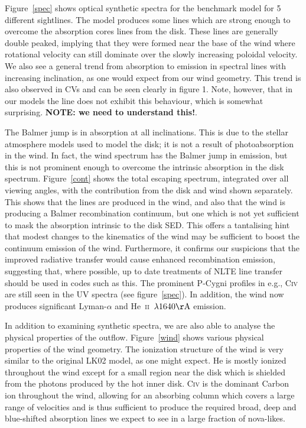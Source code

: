 \documentclass[preprint, a4paper, 11pt]{aastex}
\begin{document}
Figure~\ref{spec} shows optical synthetic spectra for the benchmark 
model for 5 different sightlines.  
The model produces some lines which are strong enough to overcome
the absorption cores lines from the disk. These lines are generally double peaked, 
implying that they were formed near the base of the wind where rotational velocity
can still dominate over the slowly increasing poloidal velocity. 
We also see a general trend from absorption to emission in spectral lines
with increasing inclination, as one would expect from our wind geometry.
This trend is also observed in CVs and can be seen clearly in figure 1. 
Note, however,
that in our models the \heiiuv line does not exhibit this behaviour, which
is somewhat surprising. {\bf NOTE: we need to understand this!}.

The Balmer jump is in absorption at all inclinations. This is 
due to the stellar atmosphere models used to model the disk;
it is not a result of photoabsorption in the wind.
In fact, the wind spectrum has the Balmer jump in emission, 
but this is not prominent enough
to overcome the intrinsic absorption in the disk spectrum. 
Figure~\ref{cont} shows the total escaping spectrum, integrated
over all viewing angles, with the contribution from the disk and wind
shown separately. This shows that the lines are produced in the wind,
and also that the wind is producing a Balmer recombination
continuum, but one which is not yet sufficient to mask the absorption 
intrinsic to the disk SED. This offers a tantalising hint
that modest changes to the kinematics of the wind
may be sufficient to boost the continuum emission of the wind.
Furthermore, it confirms our suspicions that the improved
radiative transfer would cause enhanced recombination emission,
suggesting that, where possible, up to date treatments of
NLTE line transfer should be used in codes such as this.
The prominent P-Cygni profiles in e.g., C\textsc{iv} are still seen
in the UV spectra (see figure~\ref{spec}). In addition, the wind 
now produces significant Lyman-$\alpha$ and
He~\textsc{ii}~$\lambda1640{\rm \AA}$  emission. 

In addition to examining synthetic spectra, we are also able to 
analyse the physical properties of the outflow.
Figure~\ref{wind} shows various physical properties
of the wind geometry. The ionization structure of the wind
is very similar to the original LK02 model, as one might expect.
He is mostly ionized throughout the wind except for a small region near
the disk which is shielded from the photons produced by the hot inner disk.
C\textsc{iv} is the dominant Carbon ion throughout the wind, allowing
for an absorbing column which covers a large range of velocities and is thus
sufficient to produce the required broad, deep and blue-shifted absorption lines
we expect to see in a large fraction of nova-likes.
\end{document}
